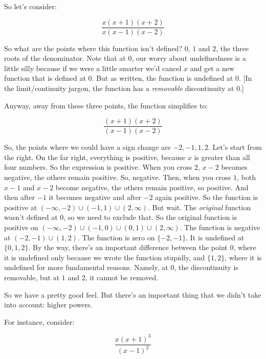 \documentclass{amsart}
\begin{document}
So let's consider:

\begin{equation*}
  \frac{x(x+1)(x+2)}{x(x-1)(x-2)}
\end{equation*}

So what are the points where this function isn't defined? $0$, $1$ and
$2$, the three roots of the denominator. Note that at $0$, our worry
about undefinedness is a little silly because if we were a little
smarter we'd cancel $x$ and get a new function that is defined at
$0$. But as written, the function is undefined at $0$. [In the
limit/continuity jargon, the function has a {\em removable}
discontinuity at $0$.]

Anyway, away from these three points, the function simplifies to:

\begin{equation*}
  \frac{(x+1)(x+2)}{(x - 1)(x - 2)}
\end{equation*}

So, the points where we could have a sign change are
$-2,-1,1,2$. Let's start from the right. On the far right, everything
is positive, because $x$ is greater than all four numbers. So the
expression is positive. When you cross $2$, $x - 2$ becomes negative,
the others remain positive. So, negative. Then, when you cross $1$,
both $x - 1$ and $x - 2$ become negative, the others remain positive,
so positive. And then after $-1$ it becomes negative and after $-2$
again positive. So the function is positive at $(-\infty,-2) \cup
(-1,1) \cup (2,\infty)$. But wait. The {\em original} function wasn't
defined at $0$, so we need to exclude that. So the original function
is positive on $(-\infty,-2) \cup (-1,0) \cup (0,1) \cup (2,
\infty)$. The function is negative at $(-2,-1) \cup (1,2)$. The
function is zero on $\{ -2,-1 \}$. It is undefined at $\{0,1,2\}$. By
the way, there's an important difference between the point $0$, where
it is undefined only because we wrote the function stupidly, and $\{
1,2 \}$, where it is undefined for more fundamental reasons. Namely,
at $0$, the discontinuity is removable, but at $1$ and $2$, it cannot
be removed.

So we have a pretty good feel. But there's an important thing that we
didn't take into account: higher powers.

For instance, consider:

\begin{equation*}
  \frac{x(x+1)^3}{(x - 1)^2}
\end{equation*}
\end{document}
